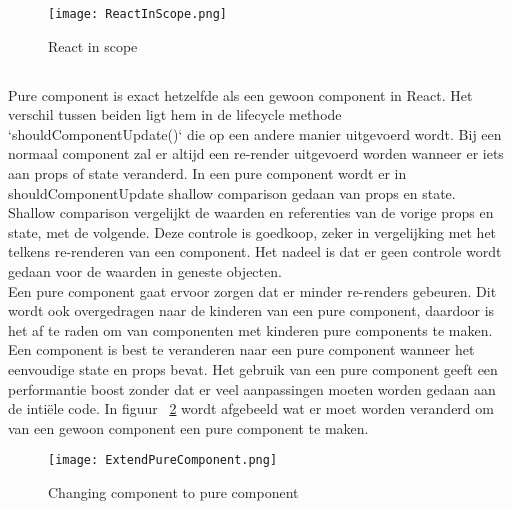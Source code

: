 \begin{figure}[H]
    \texttt{[image: ReactInScope.png]}
    \caption{React in scope}
    \label{fig:reactImport}
\end{figure}

\subsection{}
\label{sec:pureComponent}

Pure component is exact hetzelfde als een gewoon component in React. Het verschil tussen beiden ligt hem in de lifecycle methode `shouldComponentUpdate()` die op een andere manier uitgevoerd wordt. Bij een normaal component zal er altijd een re-render uitgevoerd worden wanneer er iets aan props of state veranderd. In een pure component wordt er in shouldComponentUpdate shallow comparison gedaan van props en state.\\
Shallow comparison vergelijkt de waarden en referenties van de vorige props en state, met de volgende. Deze controle is goedkoop, zeker in vergelijking met het telkens re-renderen van een component. Het nadeel is dat er geen controle wordt gedaan voor de waarden in geneste objecten.\\
Een pure component gaat ervoor zorgen dat er minder re-renders gebeuren. Dit wordt ook overgedragen naar de kinderen van een pure component, daardoor is het af te raden om van componenten met kinderen pure components te maken.\\
\newline
Een component is best te veranderen naar een pure component wanneer het eenvoudige state en props bevat. Het gebruik van een pure component geeft een performantie boost zonder dat er veel aanpassingen moeten worden gedaan aan de intiële code. In figuur ~\ref{fig:extendPureComponent} wordt afgebeeld wat er moet worden veranderd om van een gewoon component een pure component te maken.

\begin{figure}[H]
    \texttt{[image: ExtendPureComponent.png]}
    \caption{Changing component to pure component}
    \label{fig:extendPureComponent}
\end{figure}

\subsection{}
\label{sec:memo}

